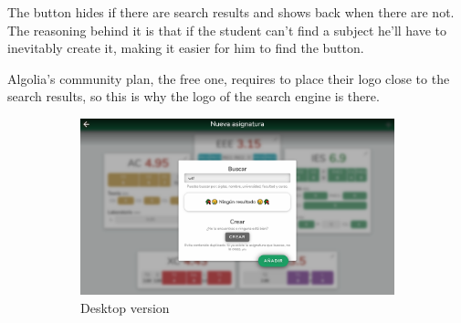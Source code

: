 The  button hides if there are search results and shows back when there are not. The reasoning behind it is that if the student can't find a subject he'll have to inevitably create it, making it easier for him to find the button.

Algolia's community plan\cite{algolia-community-plan}, the free one, requires to place their logo close to the search results, so this is why the logo of the search engine is there.

\vfill
\begin{figure}[ht!]
    \begin{subfigure}[b]{0.757\textwidth-0.1cm}
        \centering
        \includegraphics[width=\textwidth]{media/screenshots/screenshot-search-nothing-pc.png}
        \caption{Desktop version}
    \end{subfigure}
    \hfill
    \begin{subfigure}[b]{0.243\textwidth-0.1cm}
        \centering

\end{subfigure}
\end{figure}
